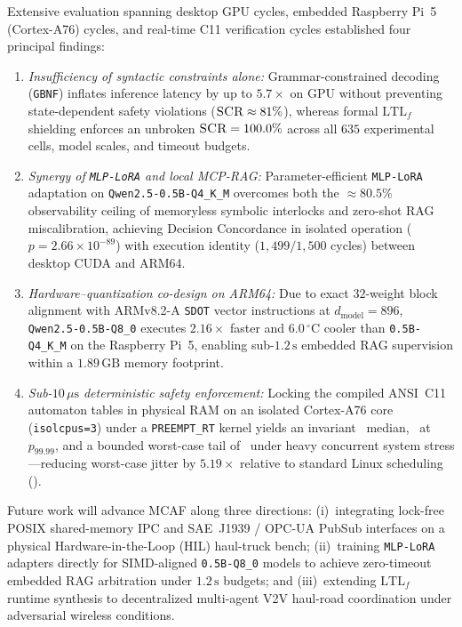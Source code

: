 \documentclass{ieeeaccess}
\begin{document}
Extensive evaluation spanning {\TotalDesktopCycles} desktop GPU cycles, {\TotalPiCycles} embedded Raspberry Pi~5 (Cortex-A76) cycles, and {\TotalCShieldCycles} real-time C11 verification cycles established four principal findings:
\begin{enumerate}
    \item \emph{Insufficiency of syntactic constraints alone:} Grammar-constrained decoding (\texttt{GBNF}) inflates inference latency by up to $5.7\times$ on GPU without preventing state-dependent safety violations ($\textsc{SCR} \approx 81\%$), whereas formal $\mathrm{LTL}_f$ shielding enforces an unbroken $\textsc{SCR} = 100.0\%$ across all $635$ experimental cells, model scales, and timeout budgets.
    \item \emph{Synergy of \texttt{MLP-LoRA} and local MCP-RAG:} Parameter-efficient \texttt{MLP-LoRA} adaptation on \texttt{Qwen2.5-0.5B-Q4\_K\_M} overcomes both the $\approx 80.5\%$ observability ceiling of memoryless symbolic interlocks and zero-shot RAG miscalibration, achieving {\LoRAHybridRAGDC} Decision Concordance in isolated operation ($p = 2.66 \times 10^{-89}$) with {\CrossArchLoRAIdentity} execution identity ($1{,}499/1{,}500$ cycles) between desktop CUDA and ARM64.
    \item \emph{Hardware--quantization co-design on ARM64:} Due to exact $32$-weight block alignment with ARMv8.2-A \texttt{SDOT} vector instructions at $d_{\mathrm{model}} = 896$, \texttt{Qwen2.5-0.5B-Q8\_0} executes $2.16\times$ faster and $6.0\,^\circ\text{C}$ cooler than \texttt{0.5B-Q4\_K\_M} on the Raspberry Pi~5, enabling sub-$1.2\,\text{s}$ embedded RAG supervision within a $1.89\,\text{GB}$ memory footprint.
    \item \emph{Sub-$10\,\mu\text{s}$ deterministic safety enforcement:} Locking the compiled ANSI~C11 automaton tables in physical RAM on an isolated Cortex-A76 core (\texttt{isolcpus=3}) under a \texttt{PREEMPT\_RT} kernel yields an invariant \CShieldMedianNs\ median, \CShieldPFourNinesNs\ at $p_{99.99}$, and a bounded worst-case tail of \CShieldRTStressedMaxUs\ under heavy concurrent system stress—reducing worst-case jitter by $5.19\times$ relative to standard Linux scheduling (\CShieldStdMaxUs).
\end{enumerate}

Future work will advance MCAF along three directions: (i)~integrating lock-free POSIX shared-memory IPC and SAE~J1939 / OPC-UA PubSub interfaces on a physical Hardware-in-the-Loop (HIL) haul-truck bench; (ii)~training \texttt{MLP-LoRA} adapters directly for SIMD-aligned \texttt{0.5B-Q8\_0} models to achieve zero-timeout embedded RAG arbitration under $1.2\,\text{s}$ budgets; and (iii)~extending $\mathrm{LTL}_f$ runtime synthesis to decentralized multi-agent V2V haul-road coordination under adversarial wireless conditions.
\end{document}
